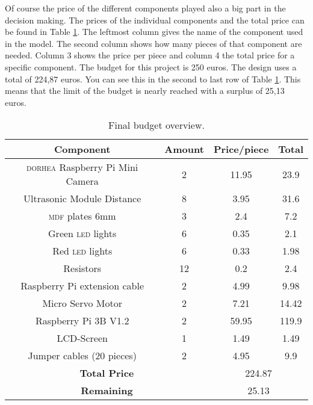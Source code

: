 Of course the price of the different components played also a big part in the decision making. The prices of the individual components and the total price can be found in Table \ref{tab:budget}. The leftmost column gives the name of the component used in the
model. The second column shows how many pieces of that component are needed. Column 3 shows the price
per piece and column 4 the total price for a specific component.
The budget for this project is 250 euros. The design uses a total of 224,87 euros. You can see
this in the second to last row of Table \ref{tab:budget}. This means that the limit of the budget is nearly reached with a surplus of
25,13 euros. \newline


\begin{table}[htp]
    \centering
    \caption{Final budget overview.}
\begin{tabular}{|c|c|c|c|}
	\hline
	\textbf{Component} & \textbf{Amount} & \textbf{Price/piece} & \textbf{Total} \\
	\hline
	\textsc{dorhea} Raspberry Pi Mini Camera & 2 & 11.95 & 23.9 \\
	\hline
	Ultrasonic Module Distance & 8 & 3.95 & 31.6 \\
	\hline
	\textsc{mdf} plates 6mm & 3 & 2.4 & 7.2 \\
	\hline
	Green \textsc{led} lights & 6 & 0.35 & 2.1 \\
	\hline
	Red \textsc{led} lights & 6 & 0.33 & 1.98 \\
	\hline
	Resistors & 12 & 0.2 & 2.4 \\
	\hline
	Raspberry Pi extension cable & 2 & 4.99 & 9.98 \\
	\hline
	Micro Servo Motor & 2 & 7.21 & 14.42 \\
	\hline
    Raspberry Pi 3B V1.2 & 2 & 59.95 & 119.9 \\
    \hline
    LCD-Screen & 1 & 1.49 & 1.49 \\
    \hline
    Jumper cables (20 pieces) & 2 & 4.95 & 9.9 \\
    \hline
	\multicolumn{2}{|c|}{\textbf{Total Price}} & \multicolumn{2}{c|}{224.87} \\
	\hline
	\multicolumn{2}{|c|}{\textbf{Remaining}} & \multicolumn{2}{c|}{25.13} \\

	\hline
\end{tabular}
        
    \label{tab:budget}
\end{table}
